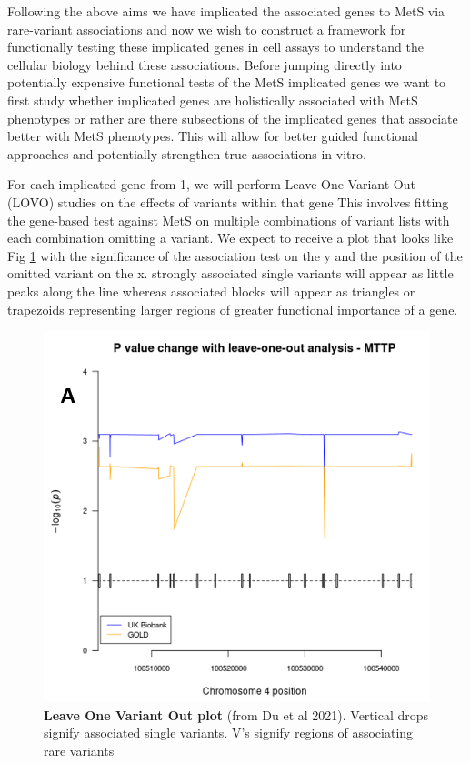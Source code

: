 \documentclass[11pt]{article}
\begin{document}
\noindent {}

Following the above aims we have implicated the associated genes to MetS via rare-variant associations and now we wish to construct a framework for functionally testing these implicated genes in cell assays to understand the cellular biology behind these associations. Before jumping directly into potentially expensive functional tests of the MetS implicated genes we want to first study whether implicated genes are holistically associated with MetS phenotypes or rather are there subsections of the implicated genes that associate better with MetS phenotypes. This will allow for better guided functional approaches and potentially strengthen true associations in vitro.

\noindent {}

For each implicated gene from 1, we will perform Leave One Variant Out (LOVO) studies on the effects of variants within that gene This involves fitting the gene-based test against MetS on multiple combinations of variant lists with each combination omitting a variant. We expect to receive a plot that looks like Fig \ref{fig:f2} with the significance of the association test on the y and the position of the omitted variant on the x. strongly associated single variants will appear as little peaks along the line whereas associated blocks will appear as triangles or trapezoids representing larger regions of greater functional importance of a gene.

\begin{figure}
  \includegraphics[width=1.0\linewidth]{"images/fig2.png"} 
  \caption{\textbf{Leave One Variant Out plot} (from Du et al 2021). Vertical drops signify associated single variants. V's signify regions of associating rare variants}
  \label{fig:f2}
\end{figure}
  
\end{document}
